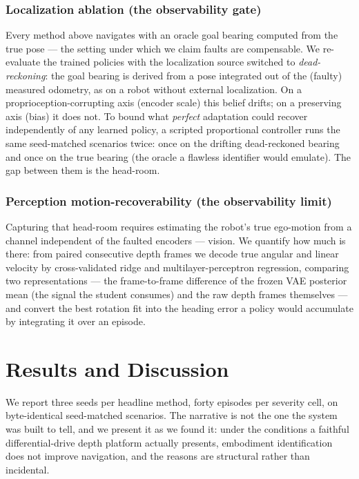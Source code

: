 \documentclass[journal]{IEEEtran}
\begin{document}
\subsubsection{Localization ablation (the observability gate)}
Every method above navigates with an oracle goal bearing computed from the
true pose --- the setting under which we claim faults are compensable. We
re-evaluate the trained policies with the localization source switched to
\emph{dead-reckoning}: the goal bearing is derived from a pose integrated out
of the (faulty) measured odometry, as on a robot without external
localization. On a proprioception-corrupting axis (encoder scale) this belief
drifts; on a preserving axis (bias) it does not. To bound what \emph{perfect}
adaptation could recover independently of any learned policy, a scripted
proportional controller runs the same seed-matched scenarios twice: once on
the drifting dead-reckoned bearing and once on the true bearing (the oracle a
flawless identifier would emulate). The gap between them is the head-room.

\subsubsection{Perception motion-recoverability (the observability limit)}
Capturing that head-room requires estimating the robot's true ego-motion from
a channel independent of the faulted encoders --- vision. We quantify how much
is there: from paired consecutive depth frames we decode true angular and
linear velocity by cross-validated ridge and multilayer-perceptron regression,
comparing two representations --- the frame-to-frame difference of the frozen
VAE posterior mean (the signal the student consumes) and the raw depth frames
themselves --- and convert the best rotation fit into the heading error a
policy would accumulate by integrating it over an episode.

\section{Results and Discussion}\label{sec:results}
We report three seeds per headline method, forty episodes per severity cell,
on byte-identical seed-matched scenarios. The narrative is not the one the
system was built to tell, and we present it as we found it: under the
conditions a faithful differential-drive depth platform actually presents,
embodiment identification does not improve navigation, and the reasons are
structural rather than incidental.
\end{document}
